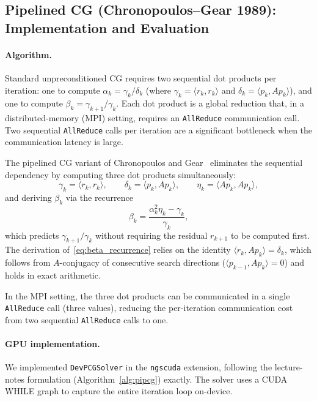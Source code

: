\subsection*{Pipelined CG (Chronopoulos--Gear 1989): Implementation and Evaluation}

\paragraph{Algorithm.}
Standard unpreconditioned CG requires two sequential dot products per iteration:
one to compute $\alpha_k = \gamma_k / \delta_k$ (where $\gamma_k = \langle r_k, r_k \rangle$
and $\delta_k = \langle p_k, Ap_k \rangle$), and one to compute
$\beta_k = \gamma_{k+1} / \gamma_k$.
Each dot product is a global reduction that, in a distributed-memory (MPI) setting,
requires an \texttt{AllReduce} communication call.
Two sequential \texttt{AllReduce} calls per iteration are a significant bottleneck
when the communication latency is large.

The pipelined CG variant of Chronopoulos and Gear~\cite{chronopoulos1989s}
eliminates the sequential dependency by computing three dot products simultaneously:
\[
  \gamma_k = \langle r_k, r_k \rangle, \qquad
  \delta_k = \langle p_k, Ap_k \rangle, \qquad
  \eta_k   = \langle Ap_k, Ap_k \rangle,
\]
and deriving $\beta_k$ via the recurrence
\begin{equation}\label{eq:beta_recurrence}
  \beta_k = \frac{\alpha_k^2 \eta_k - \gamma_k}{\gamma_k},
\end{equation}
which predicts $\gamma_{k+1} / \gamma_k$ without requiring the residual $r_{k+1}$
to be computed first.
The derivation of~\eqref{eq:beta_recurrence} relies on the identity
$\langle r_k, Ap_k \rangle = \delta_k$,
which follows from $A$-conjugacy of consecutive search directions
($\langle p_{k-1}, Ap_k \rangle = 0$) and holds in exact arithmetic.

In the MPI setting, the three dot products can be communicated in a single
\texttt{AllReduce} call (three values), reducing the per-iteration communication
cost from two sequential \texttt{AllReduce} calls to one.

\paragraph{GPU implementation.}
We implemented \texttt{DevPCGSolver} in the \texttt{ngscuda} extension,
following the lecture-notes formulation (Algorithm~\ref{alg:pipcg}) exactly.
The solver uses a CUDA WHILE graph to capture the entire iteration loop on-device.

